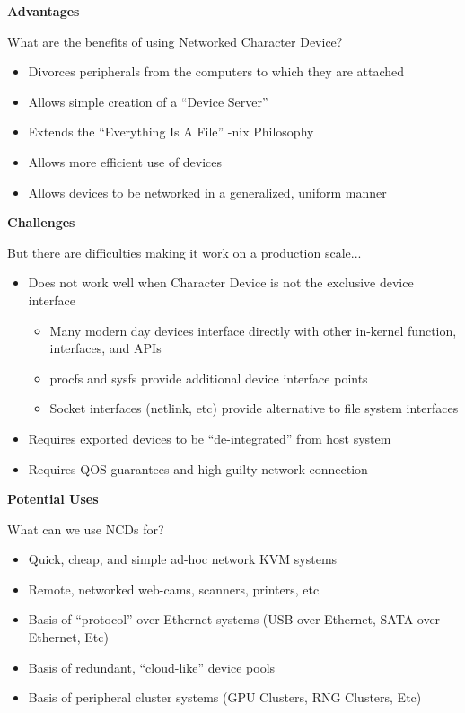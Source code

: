 \documentclass[xcolor=dvipsnames]{beamer}
\begin{document}
\begin{frame}{\bf Advantages}

What are the benefits of using Networked Character Device?

\begin{itemize}
\item Divorces peripherals from the computers to which they are
  attached
\item Allows simple creation of a ``Device Server''
\item Extends the ``Everything Is A File'' -nix Philosophy
\item Allows more efficient use of devices
\item Allows devices to be networked in a generalized, uniform manner
\end{itemize}

\end{frame}

\begin{frame}{\bf Challenges}

But there are difficulties making it work on a production scale...

\begin{itemize}
\item Does not work well when Character Device is not the exclusive
  device interface
  \begin{itemize}
  \item Many modern day devices interface directly with other
    in-kernel function, interfaces, and APIs
  \item procfs and sysfs provide additional device interface points
  \item Socket interfaces (netlink, etc) provide alternative to file
    system interfaces
  \end{itemize}
\item Requires exported devices to be ``de-integrated'' from host system
\item Requires QOS guarantees and high guilty network connection
\end{itemize}

\end{frame}

\begin{frame}{\bf Potential Uses}

What can we use NCDs for?

\begin{itemize}
\item Quick, cheap, and simple ad-hoc network KVM systems
\item Remote, networked web-cams, scanners, printers, etc
\item Basis of ``protocol''-over-Ethernet systems (USB-over-Ethernet,
  SATA-over-Ethernet, Etc)
\item Basis of redundant, ``cloud-like'' device pools
\item Basis of peripheral cluster systems (GPU Clusters, RNG Clusters,
  Etc)
\end{itemize}

\end{frame}
\end{document}
